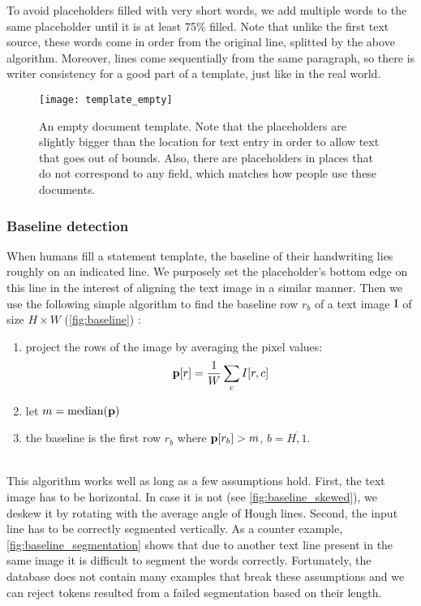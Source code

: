 			To avoid placeholders filled with very short words, we add multiple words to the same placeholder until it is at least 75\% filled. Note that unlike the first text source, these words come in order from the original line, splitted by the above algorithm. Moreover, lines come sequentially from the same paragraph, so there is writer consistency for a good part of a template, just like in the real world.

			\begin{figure}
				\texttt{[image: template\_empty]}
				\caption[Document template]{An empty document template. Note that the placeholders are slightly bigger than the location for text entry in order to allow text that goes out of bounds. Also, there are placeholders in places that do not correspond to any field, which matches how people use these documents.}
				\label{fig:template}
			\end{figure}


		\subsubsection{Baseline detection}
			When humans fill a statement template, the baseline of their handwriting lies roughly on an indicated line.  We purposely set the placeholder's bottom edge on this line in the interest of aligning the text image in a similar manner. Then we use the following simple algorithm to find the baseline row \(r_b\) of a text image \(\mathrm{I}\) of size \(H \times W\) (\autoref{fig:baseline}) :
			\noindent\begin{minipage}{\linewidth}
			\begin{enumerate}
				\item project the rows of the image by averaging the pixel values: \[
					\mathbf{p}[r] = \frac{1}{W} \sum_c I[r,c]
				\]
				\item let \(m = \operatorname{median}(\mathbf{p})\)
				\item the baseline is the first row \(r_b\) where \(\mathbf{p}[r_b] > m\), \(b = \overline{H, 1}\).
			\end{enumerate}
			\end{minipage}\\

			This algorithm works well as long as a few assumptions hold. First, the text image has to be horizontal. In case it is not (see \autoref{fig:baseline_skewed}), we deskew it by rotating with the average angle of Hough lines. Second, the input line has to be correctly segmented vertically. As a counter example, \autoref{fig:baseline_segmentation} shows that due to another text line present in the same image it is difficult to segment the words correctly. Fortunately, the database does not contain many examples that break these assumptions and we can reject tokens resulted from a failed segmentation based on their length.

